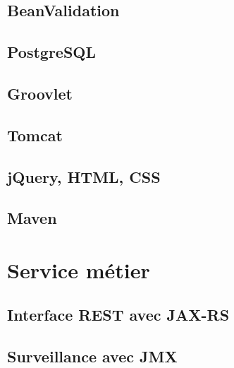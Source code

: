 \documentclass{article}
\begin{document}
\subsection{BeanValidation} %
\label{sub:beanvalidation}

\subsection{PostgreSQL} %
\label{sub:postgresql}

\subsection{Groovlet} %
\label{sub:groovlet}

\subsection{Tomcat} %
\label{sub:tomcat}

\subsection{jQuery, HTML, CSS} %
\label{sub:jquery}

\subsection{Maven} %
\label{sub:maven}


\section{Service métier} %
\label{sec:service_metier}

\subsection{Interface REST avec JAX-RS} %
\label{sub:interface_rest}

\subsection{Surveillance avec JMX} %
\label{sub:surveillance_jmx}
\end{document}
